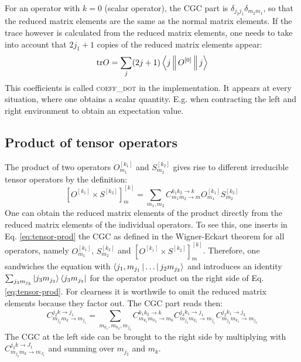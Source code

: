 \documentclass[a4paper,10pt,parskip=full]{scrartcl}
\begin{document}
For an operator with $k=0$ (scalar operator), the CGC part is $\delta_{j_2j_1}\delta_{m_2m_1}$,
so that the reduced matrix elements are the same as the normal matrix elements.
If the trace however is calculated from the reduced matrix elements,
one needs to take into account
that $2j_1+1$ copies of the reduced matrix elements appear:
\begin{equation}
  \text{tr}O=\sum_j(2j+1)\Braket{j||O^{[0]}||j}
\end{equation}
This coefficients is called \textsc{coeff\_dot} in the implementation.
It appears at every situation, where one obtains a scalar quantity.
E.g. when contracting the left and right environment to obtain an expectation value.
\subsection{Product of tensor operators}
The product of two operators $O^{[k_1]}_{m_1}$ and $S^{[k_2]}_{m_2}$
gives rise to different irreducible tensor operators by the definition:
\begin{equation}
  \label{eq:tensor-prod}
  \left[O^{[k_1]}\times S^{[k_2]}\right]^{[k]}_m = \sum_{m_1,m_2} C^{k_1k_2\rightarrow k}_{m_1m_2\rightarrow m} O^{[k_1]}_{m_1}S^{[k_2]}_{m_2}
\end{equation}
One can obtain the reduced matrix elements of the product directly from the reduced matrix elements
of the individual operators. To see this, one inserts in Eq. \eqref{eq:tensor-prod}
the CGC as defined in the Wigner-Eckart theorem for all operators, namely $O^{[k_1]}_{m_1}$,  $S^{[k_2]}_{m_2}$
and $\left[O^{[k_1]}\times S^{[k_2]}\right]^{[k]}_m$. Therefore, one sandwiches the equation with
$\Braket{j_1,m_{j_1}|\dots|j_2m_{j_2}}$ and introduces an identity $\sum_{j_3m_{j_3}}\Ket{j_3m_{j_3}}\Bra{j_3m_{j_3}}$
for the operator product on the right side of Eq. \eqref{eq:tensor-prod}.
For clearness it is worthwile to omit the reduced matrix elements because they factor out.
The CGC part reads then:
\begin{equation}
  C^{j_2k\rightarrow j_1}_{m_{j_2}m_k\rightarrow m_{j_1}}  =
  \sum_{m_{k_1},m_{k_2},m_{j_3}}
  C^{k_1k_2\rightarrow k}_{m_{k_1}m_{k_2}\rightarrow m_{k}}
  C^{j_3k_1\rightarrow j_1}_{m_{j_3}m_{k_1}\rightarrow m_{j_1}}
  C^{j_2k_1\rightarrow j_3}_{m_{j_2}m_{k_1}\rightarrow m_{j_3}}
\end{equation}
The CGC at the left side can be brought to the right side by multiplying
with $C^{j_2k\rightarrow J_1}_{m_{j_2}m_k\rightarrow m_{J_1}}$ and summing over $m_{j_2}$ and $m_k$.
\end{document}
